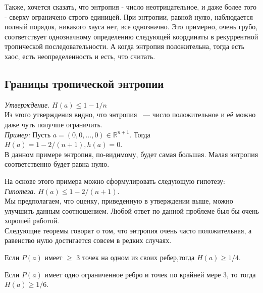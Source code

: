 \documentclass[russian]{lecture-notes}
\begin{document}
Также, хочется сказать, что энтропия - число неотрицательное, и даже более того - сверху ограничено строго единицей. При энтропии, равной нулю, наблюдается полный порядок, никакого хауса нет, все однозначно. Это примерно, очень грубо, соответствует однозначному определению следующей координаты в рекуррентной тропической последовательности. А когда энтропия положительна, тогда есть хаос, есть неопределенность и есть, что считать.
\subsection{Границы тропической энтропии}


\emph{Утверждение.} $H(a) \le 1 - 1/n$\\

Из этого утверждения видно, что энтропия ~--- число положительное и её можно даже чуть получше ограничить.\\

\emph{Пример:}
Пусть $a = (0,0,\ldots,0) \in \mathbb{R}^{n+1}.$ Тогда $H(a) = 1 - 2/(n+1), h(a) = 0.$ \\

В данном примере энтропия, по-видимому, будет самая большая. Малая энтропия соответственно будет равна нулю.

На основе этого примера можно сформулировать следующую гипотезу:\\

\emph{ Гипотеза.}  $H(a) \le 1 - 2/(n+1).$\\

Мы предполагаем, что оценку, приведенную в утверждении выше, можно улучшить данным соотношением. Любой ответ по данной проблеме был бы очень хорошей работой.\\

Следующие теоремы говорят о том, что энтропия очень часто положительная, а равенство нулю достигается совсем в редких случаях.\\
\begin{Theorem}
	Если $P(a)$ имеет $\ge$ 3 точек на одном из своих ребер,тогда $H(a) \ge 1/4$.
\end{Theorem}

\begin{Theorem}
 Если $P(a)$ имеет одно ограниченное ребро и точек по крайней мере 3, то тогда $H(a) \ge 1/6$.\\
\end{Theorem}
\end{document}
